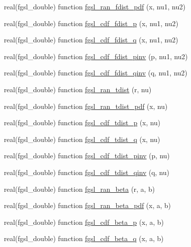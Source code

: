 \begin{DoxyCompactItemize}
\item 
real(fgsl\+\_\+double) function \hyperlink{rng_8finc_a752a7663a532c2765b796040098568e8}{fgsl\+\_\+ran\+\_\+fdist\+\_\+pdf} (x, nu1, nu2)
\item 
real(fgsl\+\_\+double) function \hyperlink{rng_8finc_a83d8d3cbe6899eadccd876c082e855b7}{fgsl\+\_\+cdf\+\_\+fdist\+\_\+p} (x, nu1, nu2)
\item 
real(fgsl\+\_\+double) function \hyperlink{rng_8finc_a8d5d5e89002d7fa3b09a8f0dcb223328}{fgsl\+\_\+cdf\+\_\+fdist\+\_\+q} (x, nu1, nu2)
\item 
real(fgsl\+\_\+double) function \hyperlink{rng_8finc_a5b0a774f2b2bfd4ff9a6b2bcba45e5b8}{fgsl\+\_\+cdf\+\_\+fdist\+\_\+pinv} (p, nu1, nu2)
\item 
real(fgsl\+\_\+double) function \hyperlink{rng_8finc_af6ee56a13f73d763ac76b58262768bbb}{fgsl\+\_\+cdf\+\_\+fdist\+\_\+qinv} (q, nu1, nu2)
\item 
real(fgsl\+\_\+double) function \hyperlink{rng_8finc_a588d0c7b571fa84a50e5bc06bd1c58e3}{fgsl\+\_\+ran\+\_\+tdist} (r, nu)
\item 
real(fgsl\+\_\+double) function \hyperlink{rng_8finc_adefcc6298f2b2b37d112870027638578}{fgsl\+\_\+ran\+\_\+tdist\+\_\+pdf} (x, nu)
\item 
real(fgsl\+\_\+double) function \hyperlink{rng_8finc_ace1197a0d3e0f71deda76ecc42b36dcf}{fgsl\+\_\+cdf\+\_\+tdist\+\_\+p} (x, nu)
\item 
real(fgsl\+\_\+double) function \hyperlink{rng_8finc_a4a1e3a8ce1487a5489502e2264c858c9}{fgsl\+\_\+cdf\+\_\+tdist\+\_\+q} (x, nu)
\item 
real(fgsl\+\_\+double) function \hyperlink{rng_8finc_a2473363fb7a8a2283461ae512996150f}{fgsl\+\_\+cdf\+\_\+tdist\+\_\+pinv} (p, nu)
\item 
real(fgsl\+\_\+double) function \hyperlink{rng_8finc_acd06e7e1635e1d1946e0891f0ddc8fa3}{fgsl\+\_\+cdf\+\_\+tdist\+\_\+qinv} (q, nu)
\item 
real(fgsl\+\_\+double) function \hyperlink{rng_8finc_a22e4189fd2ecd84ea6afdab388e7a1fb}{fgsl\+\_\+ran\+\_\+beta} (r, a, b)
\item 
real(fgsl\+\_\+double) function \hyperlink{rng_8finc_af65213d7b9b1dc033ba0b54876d577ed}{fgsl\+\_\+ran\+\_\+beta\+\_\+pdf} (x, a, b)
\item 
real(fgsl\+\_\+double) function \hyperlink{rng_8finc_a98571bac63e7448953ce6b83270fea54}{fgsl\+\_\+cdf\+\_\+beta\+\_\+p} (x, a, b)
\item 
real(fgsl\+\_\+double) function \hyperlink{rng_8finc_a1f77adb144c89fd15a5a9902b3fb0f0a}{fgsl\+\_\+cdf\+\_\+beta\+\_\+q} (x, a, b)

\end{DoxyCompactItemize}
